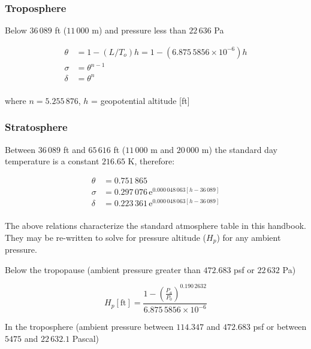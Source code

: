 \documentclass[
]{book}
\begin{document}
\hypertarget{troposphere}{%
\subsubsection*{Troposphere}\label{troposphere}}

Below \(36\,089\) ft (\(11\,000\) m) and pressure less than \(22\,636\) Pa

\[
\begin{align}
\theta &= 1 − \left( L/Τ_ο \right) h = 1 - \left( 6.875\,5856 \times 10^{-6} \right) h \\
\sigma &= \theta^{n-1} \\
\delta &= \theta^n \\
\end{align}
\]

where \(n = 5.255\,876\), \(h\) = geopotential altitude {[}ft{]}

\hypertarget{stratosphere}{%
\subsubsection*{Stratosphere}\label{stratosphere}}

Between \(36\,089\) ft and \(65\,616\) ft (\(11\,000\) m and \(20\,000\) m) the standard day temperature is a constant \(216.65\) K, therefore:

\[
\begin{align}
\theta &= 0.751\,865 \\
\sigma &= 0.297\,076\, \mathrm{e}^{0.000\,048\,063 \left[ h - 36\,089 \right]} \\
\delta &= 0.223\,361\, \mathrm{e}^{0.000\,048\,063 \left[ h - 36\,089 \right]} \\
\end{align}
\]

The above relations characterize the standard atmosphere table in this handbook.
They may be re-written to solve for pressure altitude (\(H_p\)) for any ambient pressure.

Below the tropopause (ambient pressure greater than \(472.683\) psf or \(22\,632\) Pa)

\[
H_p \left[ \text{ft} \right] = \frac{ 1-\left( \frac{P_a}{P_0} \right)^{0.190\,2632} }{6.875\,5856 \times 10^{-6}}
\]

In the troposphere (ambient pressure between \(114.347\) and \(472.683\) psf or between \(5475\) and \(22\,632.1\) Pascal)
\end{document}
